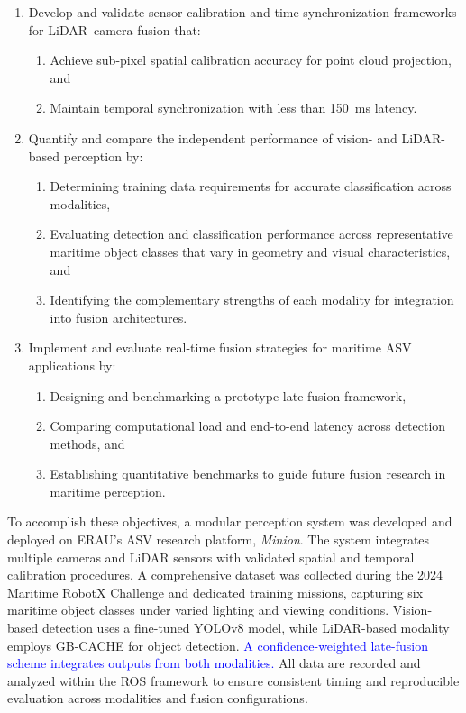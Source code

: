 \documentclass[../main.tex]{subfiles}
\begin{document}
\begin{enumerate}
    \item Develop and validate sensor calibration and time-synchronization frameworks for \ac{LiDAR}–camera fusion that:
    \begin{enumerate}
        \item Achieve sub-pixel spatial calibration accuracy for point cloud projection, and
        \item Maintain temporal synchronization with less than 150~ms latency.
    \end{enumerate}

    \item Quantify and compare the independent performance of vision- and \ac{LiDAR}-based perception by:
    \begin{enumerate}
        \item Determining training data requirements for accurate classification across modalities,
        \item Evaluating detection and classification performance across representative maritime object classes that vary in geometry and visual characteristics, and
        \item Identifying the complementary strengths of each modality for integration into fusion architectures.
    \end{enumerate}

    \item Implement and evaluate real-time fusion strategies for maritime \ac{ASV} applications by:
    \begin{enumerate}
        \item Designing and benchmarking a prototype late-fusion framework,
        \item Comparing computational load and end-to-end latency across detection methods, and
        \item Establishing quantitative benchmarks to guide future fusion research in maritime perception.
    \end{enumerate}
\end{enumerate}

To accomplish these objectives, a modular perception system was developed and deployed on \ac{ERAU}’s \ac{ASV} research platform, \textit{Minion}.
The system integrates multiple cameras and \ac{LiDAR} sensors with validated spatial and temporal calibration procedures.
A comprehensive dataset was collected during the 2024 Maritime RobotX Challenge and dedicated training missions, capturing six maritime object classes under varied lighting and viewing conditions.
Vision-based detection uses a fine-tuned YOLOv8 model, while \ac{LiDAR}-based modality employs \acl{GB-CACHE} for object detection.
\textcolor{blue}{A confidence-weighted late-fusion scheme integrates outputs from both modalities.}
All data are recorded and analyzed within the \ac{ROS} framework to ensure consistent timing and reproducible evaluation across modalities and fusion configurations.
\end{document}
